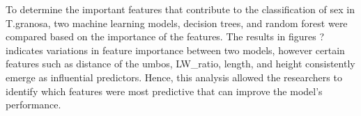To determine the important features that contribute to the classification of sex in T.granosa, two machine learning models, decision trees, and random forest were compared based on the importance of the features. The results in figures ?  indicates variations in feature importance between two models, however certain features such as distance of the umbos, LW\_ratio, length, and height consistently emerge as influential predictors. Hence, this analysis allowed the researchers to identify which features were most predictive that can improve the model’s performance. 

